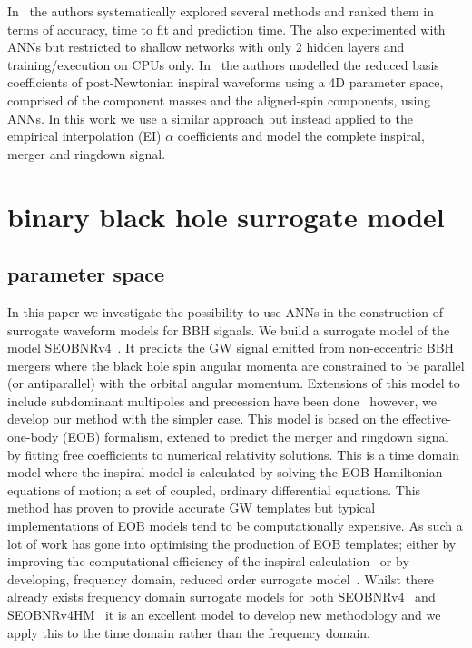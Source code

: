 \documentclass[aps,prd,reprint,superscriptaddress,preprintnumbers,showpacs,nofootinbib]{revtex4-1}
\begin{document}
In~\cite{Setyawati:2019xzw} the authors systematically explored several methods and
ranked them in terms of accuracy, time to fit and prediction time. The also
experimented with ANNs but restricted to shallow networks with only 2 hidden
layers and training/execution on CPUs only.
In~\cite{PhysRevLett.122.211101} the authors modelled the
reduced basis coefficients of post-Newtonian inspiral waveforms using a 4D
parameter space, comprised of the component masses and the aligned-spin
components, using ANNs. In this work we use a similar approach but instead
applied to the empirical interpolation (EI) $\alpha$ coefficients and model the
complete inspiral, merger and ringdown signal.


\section{binary black hole surrogate model}
\label{sec:bbhmodel}

\subsection{parameter space}

In this paper we investigate the possibility to use ANNs in the construction of
surrogate waveform models for BBH signals. We build a surrogate model of the
model SEOBNRv4~\cite{2017PhRvD..95d4028B}. It predicts the GW signal emitted
from non-eccentric BBH mergers where the black hole spin angular momenta are
constrained to be parallel (or antiparallel) with the orbital angular momentum.
Extensions of this model to include subdominant multipoles and precession have
been done~\cite{2018PhRvD..98h4028C, 2020arXiv200409442O} however, we develop
our method with the simpler case. This model is based on the effective-one-body
(EOB) formalism, extened to predict the merger and ringdown signal by fitting
free coefficients to numerical relativity solutions. This is a time domain model
where the inspiral model is calculated by solving the EOB Hamiltonian equations
of motion; a set of coupled, ordinary differential equations. This method has
proven to provide accurate GW templates but typical implementations of EOB
models tend to be computationally expensive. As such a lot of work has gone into
optimising the production of EOB templates; either by improving the
computational efficiency of the inspiral
calculation~\cite{Knowles:2018hqq,Devine2016OptimizingST,PhysRevD.99.021501} or
by developing, frequency domain, reduced order surrogate
model~\cite{2014CQGra..31s5010P}. Whilst there already exists frequency domain
surrogate models for both SEOBNRv4~\cite{2017PhRvD..95d4028B} and
SEOBNRv4HM~\cite{2020PhRvD.101l4040C} it is an excellent model to develop new
methodology and we apply this to the time domain rather than the frequency
domain.
\end{document}
